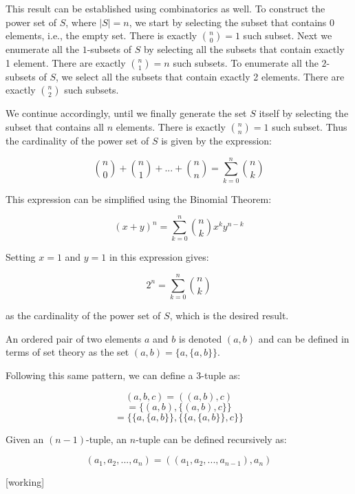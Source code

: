 \documentclass[a4paper,12pt]{article}
\begin{document}
\vspace{2mm}
This result can be established using combinatorics as well. To construct the power set of $S$, where $|S| = n$, we start by selecting the subset that contains $0$ elements, i.e., the empty set. There is exactly $\binom{n}{0} = 1$ such subset. Next we enumerate all the $1$-subsets of $S$ by selecting all the subsets that contain exactly 1 element. There are exactly $\binom{n}{1} = n$ such subsets. To enumerate all the $2$-subsets of $S$, we select all the subsets that contain exactly 2 elements. There are exactly $\binom{n}{2}$ such subsets. 

We continue accordingly, until we finally generate the set $S$ itself by selecting the subset that contains all $n$ elements. There is exactly $\binom{n}{n} = 1$ such subset. Thus the cardinality of the power set of $S$ is given by the expression:

\[ \binom{n}{0} + \binom{n}{1} + ... + \binom{n}{n} = \sum_{k=0}^n \binom{n}{k} \]

This expression can be simplified using the Binomial Theorem:

\[ \left(x+y\right)^n = \sum_{k=0}^n \binom{n}{k}x^ky^{n-k} \]

Setting $x=1$ and $y=1$ in this expression gives:

\[ 2^n = \sum_{k=0}^n \binom{n}{k} \]

\noindent
as the cardinality of the power set of $S$, which is the desired result.

\vspace{5mm}

An ordered pair of two elements $a$ and $b$ is denoted $(a,b)$ and can be defined in terms of set theory as the set $(a,b) = \{a, \{a,b\}\}$. 

Following this same pattern, we can define a 3-tuple as:

\[ (a,b,c) = ((a,b),c) \]
\[ = \{ (a,b), \{(a,b), c\}\}\]
\[ = \{ \{a, \{a,b\}\}, \{ \{a, \{ a,b\}\}, c\}\}\]

Given an $(n-1)$-tuple, an $n$-tuple can be defined recursively as:

\[ (a_1, a_2, ..., a_n) = ((a_1, a_2, ..., a_{n-1}),a_n) \]

[working]
\end{document}
